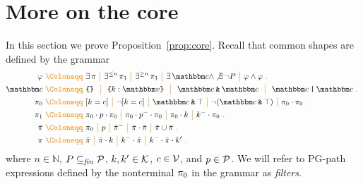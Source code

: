 \section{More on the core}
\label{sec:appendix-core}

In this section we prove Proposition~\ref{prop:core}. Recall that common shapes are defined by the grammar 
\begin{align*}
\varphi  \gDef  & 
 \exists\,\pexpr
\gMid \exists^{\leq n} \, \pexpr_1
\gMid \exists^{\geq n} \, \pexpr_1 \gMid 
\exists\, \ntype \land \not\exists\, \lnot P
\gMid \varphi \land \varphi \gEnd\\
\ntype \gDef &\closedRT{}\  \gMid\  \closedRT{k : \vtype} \ \gMid\   \ntype \tAnd \ntype  \ \gMid \  \ntype \tOr \ntype  \gEnd\\
\pexpr_0 \gDef & 
\keyIsVal{k}{c} \gMid 
\lnot \keyIsVal{k}{c} \gMid 
\ntype\tAnd\top\gMid \lnot (\ntype\tAnd\top) \gMid \pexpr_0 \cdot \pexpr_0 \gEnd\\
\pexpr_1 \gDef &  \pexpr_0  \cdot p \cdot
\pexpr_0 
\gMid  \pexpr_0  \cdot p^{-} \cdot
\pexpr_0  \gMid \pexpr_0\cdot k \gMid k^{-}\cdot \pexpr_0 \gEnd\\
\ppexpr \gDef & \pexpr_0  \gMid p 
\gMid {\ppexpr}^{-} \gMid \ppexpr \cdot \ppexpr 
\gMid \ppexpr \cup \ppexpr \gEnd \\
\pexpr \gDef & \ppexpr \gMid \ppexpr \cdot k \gMid k^{-}\cdot \ppexpr \gMid k^{-}\cdot \ppexpr\cdot k' \gEnd
\end{align*}
where $n \in \mathbb{N}$, $P\subseteq_{\mathit{fin}} \mathcal{P}$, $k,k'\in\mathcal{K}$, $c\in\mathcal{V}$, and $p\in\mathcal{P}$. We will refer to  PG-path expressions defined by the nonterminal $\pi_0$ in the grammar as  \emph{filters}.





